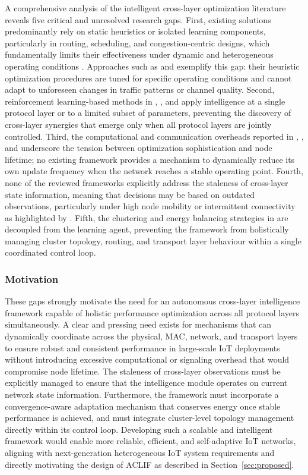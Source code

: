 \documentclass[a4paper]{cas-dc}
\numberwithin{equation}{section}
\begin{document}
A comprehensive analysis of the intelligent cross-layer optimization literature reveals five critical and unresolved research gaps. First, existing solutions predominantly rely on static heuristics or isolated learning components, particularly in routing, scheduling, and congestion-centric designs, which fundamentally limits their effectiveness under dynamic and heterogeneous operating conditions \cite{Alipio2024}. Approaches such as \cite{Benelhouri2023} and \cite{Zhang2025} exemplify this gap: their heuristic optimization procedures are tuned for specific operating conditions and cannot adapt to unforeseen changes in traffic patterns or channel quality. Second, reinforcement learning-based methods in \cite{Serra2025}, \cite{Musaddiq20201}, and \cite{Suresh2024} apply intelligence at a single protocol layer or to a limited subset of parameters, preventing the discovery of cross-layer synergies that emerge only when all protocol layers are jointly controlled. Third, the computational and communication overheads reported in \cite{Bhushan2025}, \cite{Suresh2024}, and \cite{Yang2024204} underscore the tension between optimization sophistication and node lifetime; no existing framework provides a mechanism to dynamically reduce its own update frequency when the network reaches a stable operating point. Fourth, none of the reviewed frameworks explicitly address the staleness of cross-layer state information, meaning that decisions may be based on outdated observations, particularly under high node mobility or intermittent connectivity as highlighted by \cite{Hu2025}. Fifth, the clustering and energy balancing strategies in \cite{Chaurasiya202325941} are decoupled from the learning agent, preventing the framework from holistically managing cluster topology, routing, and transport layer behaviour within a single coordinated control loop.

\subsubsection*{Motivation}

These gaps strongly motivate the need for an autonomous cross-layer intelligence framework capable of holistic performance optimization across all protocol layers simultaneously. A clear and pressing need exists for mechanisms that can dynamically coordinate across the physical, MAC, network, and transport layers to ensure robust and consistent performance in large-scale IoT deployments without introducing excessive computational or signaling overhead that would compromise node lifetime. The staleness of cross-layer observations must be explicitly managed to ensure that the intelligence module operates on current network state information. Furthermore, the framework must incorporate a convergence-aware adaptation mechanism that conserves energy once stable performance is achieved, and must integrate cluster-level topology management directly within its control loop. Developing such a scalable and intelligent framework would enable more reliable, efficient, and self-adaptive IoT networks, aligning with next-generation heterogeneous IoT system requirements and directly motivating the design of ACLIF as described in Section~\ref{sec:proposed}.
\end{document}
